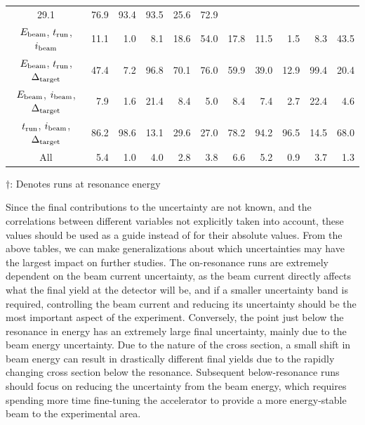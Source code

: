 \begin{landscape}
\begin{table}
\begin{center}
\begin{tabular}{crrrrrrrrrr}
    29.1 &  76.9 &  93.4 &  93.5 &  25.6 &  72.9 \\
$E_{\rm beam}$, $t_{\rm run}$, $i_{\rm beam}$ &  11.1 &   1.0 &   8.1 &
    18.6 &  54.0 &  17.8 &  11.5 &   1.5 &   8.3 &  43.5 \\
$E_{\rm beam}$, $t_{\rm run}$, $\Delta_{\rm target}$ &  47.4 &   7.2 &
    96.8 &  70.1 &  76.0 &  59.9 &  39.0 &  12.9 &  99.4 &  20.4 \\
$E_{\rm beam}$, $i_{\rm beam}$, $\Delta_{\rm target}$ &   7.9 &   1.6 &
    21.4 &   8.4 &   5.0 &   8.4 &   7.4 &   2.7 &  22.4 &   4.6 \\
$t_{\rm run}$, $i_{\rm beam}$, $\Delta_{\rm target}$ &  86.2 &  98.6 &
    13.1 &  29.6 &  27.0 &  78.2 &  94.2 &  96.5 &  14.5 &  68.0 \\
All &   5.4 &   1.0 &   4.0 &   2.8 &   3.8 &   6.6 &   5.2 &   0.9 &
    3.7 &   1.3 \\
            \bottomrule
        \end{tabular}

        \vspace{0.5em}
        $\dagger$: Denotes runs at resonance energy
    \end{center}
\end{table}
\end{landscape}

Since the final contributions to the uncertainty are not known, and the
correlations between different variables not explicitly taken into
account, these values should be used as a guide instead of for their
absolute values. From the above tables, we can make generalizations
about which uncertainties may have the largest impact on further
studies. The on-resonance runs are extremely dependent on the beam
current uncertainty, as the beam current directly affects what the final
yield at the detector will be, and if a smaller uncertainty band is
required, controlling the beam current and reducing its uncertainty
should be the most important aspect of the experiment. Conversely, the
point just below the resonance in energy has an extremely large final
uncertainty, mainly due to the beam energy uncertainty. Due to the
nature of the cross section, a small shift in beam energy can result in
drastically different final yields due to the rapidly changing cross
section below the resonance. Subsequent below-resonance runs should
focus on reducing the uncertainty from the beam energy, which requires
spending more time fine-tuning the accelerator to provide a more
energy-stable beam to the experimental area.

